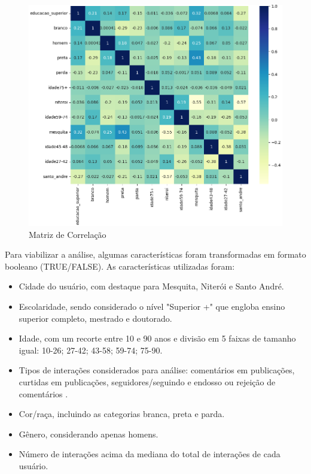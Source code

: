 \begin{figure}[!htb]
	\caption{Matriz de Correlação}
	\label{fig:colab_correlation_matrix}
	\centering
	\includegraphics[scale=0.6]{images/colab_correlation_matrix.png}
\end{figure}

Para viabilizar a análise, algumas características foram transformadas em formato booleano (TRUE/FALSE). As características utilizadas foram:

\begin{itemize}
	\item Cidade do usuário, com destaque para Mesquita, Niterói e Santo André.
	\item Escolaridade, sendo considerado o nível "Superior +" que engloba ensino superior completo, mestrado e doutorado.
	\item Idade, com um recorte entre 10 e 90 anos e divisão em 5 faixas de tamanho igual: 10-26; 27-42; 43-58; 59-74; 75-90.
	\item Tipos de interações considerados para análise: comentários em publicações, curtidas em publicações, seguidores/seguindo e endosso ou rejeição de comentários .
	\item Cor/raça, incluindo as categorias branca, preta e parda.
	\item Gênero, considerando apenas homens.
	\item Número de interações acima da mediana do total de interações de cada usuário.
\end{itemize}


